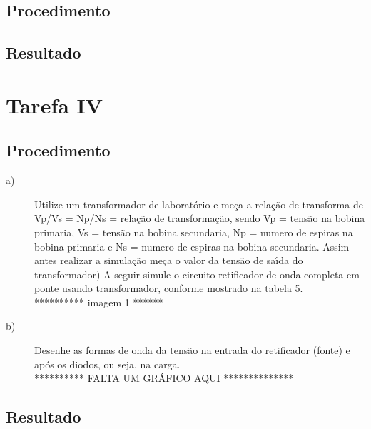 \subsection{Procedimento}
\subsection{Resultado}

\section{Tarefa IV}
\subsection{Procedimento}
\begin{description}
	\item[a)] Utilize um transformador  de laborat\'{o}rio e me\c{c}a a rela\c{c}\~{a}o de transforma de Vp/Vs = Np/Ns = rela\c{c}\~{a}o de transforma\c{c}\~{a}o, sendo Vp = tens\~{a}o na bobina primaria, Vs = tens\~{a}o na bobina secundaria, Np = numero de espiras na bobina primaria e Ns = numero de espiras na bobina secundaria. Assim antes realizar a simula\c{c}\~{a}o me\c{c}a o valor da tens\~{a}o de sa\'{\i}da do transformador)
	A seguir simule o circuito retificador de onda completa em ponte usando transformador, conforme mostrado na tabela 5. \\
	
	********** imagem 1 ****** \\
	
	\item[b)] Desenhe as formas de onda da tens\~{a}o na entrada do retificador (fonte) e ap\'{o}s os diodos, ou seja, na carga. \\

    ********** FALTA UM GR\'{A}FICO AQUI **************
\end{description}
\subsection{Resultado}

